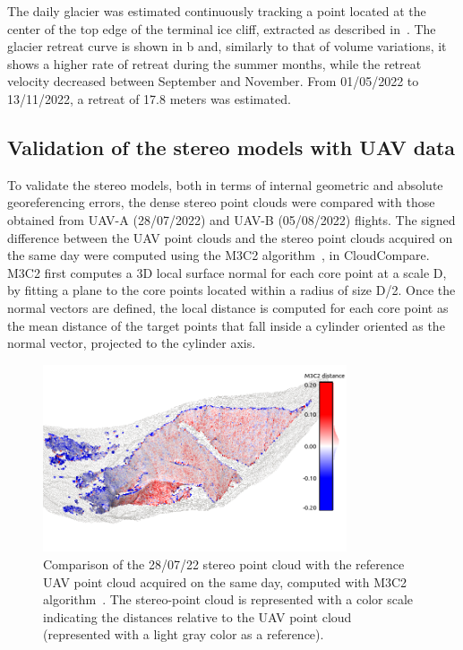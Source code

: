 The daily glacier was estimated continuously tracking a point located at the center of the top edge of the terminal ice cliff, extracted as described in~.
The glacier retreat curve is shown in b and, similarly to that of volume variations, it shows a higher rate of retreat during the summer months, while the retreat velocity decreased between September and November.
From 01/05/2022 to 13/11/2022, a retreat of 17.8 meters was estimated.

\subsection{Validation of the stereo models with UAV data}\label{sec:4:res_uav_validation}

To validate the stereo models, both in terms of internal geometric and absolute
georeferencing errors, the dense stereo point clouds were compared with those obtained from UAV-A (28/07/2022) and UAV-B (05/08/2022) flights.
The signed difference between the UAV point clouds and the stereo point clouds acquired on the same day were computed using the M3C2 algorithm~\citep{lague2013accurate}, in CloudCompare.
M3C2 first computes a 3D local surface normal for each core point at a scale
D, by fitting a plane to the core points located within a radius of size D/2.
Once the normal vectors are defined, the local distance is computed for each core point as the mean distance of the target points that fall inside a cylinder oriented as the normal vector, projected to the cylinder axis.

\begin{figure}
  \centering
  \includegraphics[width=0.8\textwidth]{4_stereo_uav_2807.png}
  \caption{Comparison of the 28/07/22 stereo point cloud with the reference UAV point cloud acquired on the same day, computed with M3C2 algorithm~\citep{lague2013accurate}. The stereo-point cloud is represented with a color scale indicating the distances relative to the UAV point cloud (represented with a light gray color as a reference).}
  \label{fig:4:stereo_uav_2807}
\end{figure}

